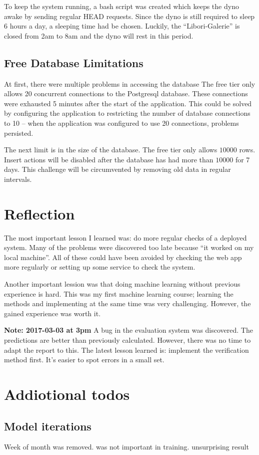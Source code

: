 \documentclass[journal,10pt]{IEEEtran}
\begin{document}
To keep the system running, a bash script was created which keeps the dyno awake by sending regular HEAD requests. Since the dyno is still required to sleep 6 hours a day, a sleeping time had be chosen. Luckily, the ``Libori-Galerie'' is closed from 2am to 8am and the dyno will rest in this period. 

\subsection{Free Database Limitations}
At first, there were multiple problems in accessing the database The free tier only allows 20 concurrent connections to the Postgresql database. These connections were exhausted 5 minutes after the start of the application. This could be solved by configuring the application to restricting the number of database connections to 10 -- when the application was configured to use 20 connections, problems persisted.

The next limit is in the size of the database. The free tier only allows \(10000\) rows. Insert actions will be disabled after the database has had more than \(10000\) for 7 days. This challenge will be circumvented by removing old data in regular intervals.


\section{Reflection}

The most important lesson I learned was: do more regular checks of a deployed system. Many of the problems were discovered too late because ``it worked on my local machine''. All of these could have been avoided by checking the web app more regularly or setting up some service to check the system.

Another important lession was that doing machine learning without previous experience is hard. This was my first machine learning course; learning the methods and implementing at the same time was very challenging. However, the gained experience was worth it.

\textbf{Note: 2017-03-03 at 3pm} A bug in the evaluation system was discovered. The predictions are better than previously calculated. However, there was no time to adapt the report to this. The latest lesson learned is: implement the verification method first. It's easier to spot errors in a small set.

\section{Addiotional todos}
\subsection{Model iterations}

Week of month was removed. was not important in training. unsurprising result

  

\end{document}

